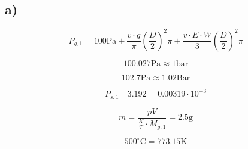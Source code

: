 

\subsection*{a)}
\begin{equation*}
P_{g,1} = 100 \text{Pa} + \frac{v \cdot g}{\pi} \left( \frac{D}{2} \right)^2 \pi + \frac{v \cdot E \cdot W}{3} \left( \frac{D}{2} \right)^2 \pi
\end{equation*}

\begin{equation*}
100.027 \text{Pa} \approx 1 \text{bar}
\end{equation*}

\begin{equation*}
102.7 \text{Pa} \approx 1.02 \text{Bar}
\end{equation*}

\begin{equation*}
P_{s,1} \quad 3.192 = 0.00319 \cdot 10^{-3}
\end{equation*}

\begin{equation*}
m = \frac{pV}{\frac{K}{T} \cdot M_{g,1}} = 2.5 \text{g}
\end{equation*}

\begin{equation*}
500^\circ \text{C} = 773.15 \text{K}
\end{equation*}